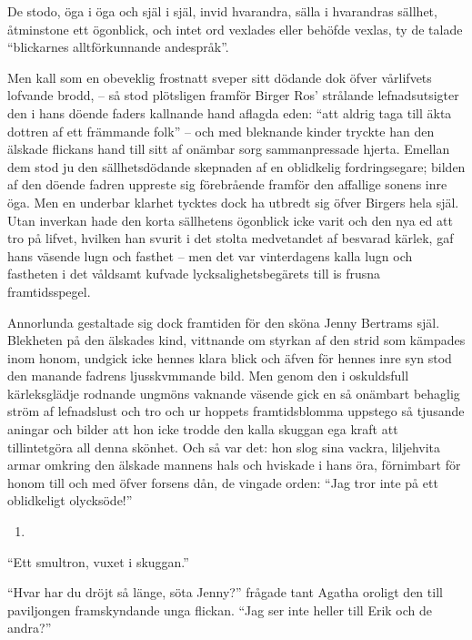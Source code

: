 De stodo, öga i öga och själ i själ, invid hvarandra, sälla i hvarandras
sällhet, åtminstone ett ögonblick, och intet ord vexlades eller behöfde
vexlas, ty de talade ``blickarnes alltförkunnande andespråk''.

Men kall som en obeveklig frostnatt sveper sitt dödande dok öfver
vårlifvets lofvande brodd, -- så stod plötsligen framför Birger Ros'
strålande lefnadsutsigter den i hans döende faders kallnande hand
aflagda eden: ``att aldrig taga till äkta dottren af ett främmande
folk'' -- och med bleknande kinder tryckte han den älskade flickans hand
till sitt af onämbar sorg sammanpressade hjerta. Emellan dem stod ju den
sällhetsdödande skepnaden af en oblidkelig fordringsegare; bilden af den
döende fadren uppreste sig förebrående framför den affallige sonens inre
öga. Men en underbar klarhet tycktes dock ha utbredt sig öfver Birgers
hela själ. Utan inverkan hade den korta sällhetens ögonblick icke varit
och den nya ed att tro på lifvet, hvilken han svurit i det stolta
medvetandet af besvarad kärlek, gaf hans väsende lugn och fasthet -- men
det var vinterdagens kalla lugn och fastheten i det våldsamt kufvade
lycksalighetsbegärets till is frusna framtidsspegel.

Annorlunda gestaltade sig dock framtiden för den sköna Jenny Bertrams
själ. Blekheten på den älskades kind, vittnande om styrkan af den strid
som kämpades inom honom, undgick icke hennes klara blick och äfven för
hennes inre syn stod den manande fadrens ljusskvmmande bild. Men genom
den i oskuldsfull kärleksglädje rodnande ungmöns vaknande väsende gick
en så onämbart behaglig ström af lefnadslust och tro och ur hoppets
framtidsblomma uppstego så tjusande aningar och bilder att hon icke
trodde den kalla skuggan ega kraft att tillintetgöra all denna skönhet.
Och så var det: hon slog sina vackra, liljehvita armar omkring den
älskade mannens hals och hviskade i hans öra, förnimbart för honom till
och med öfver forsens dån, de vingade orden: ``Jag tror inte på ett
oblidkeligt olycksöde!''

\begin{enumerate}
\def\labelenumi{\arabic{enumi}.}
\setcounter{enumi}{12}
\tightlist
\item
\end{enumerate}

``Ett smultron, vuxet i skuggan.''

``Hvar har du dröjt så länge, söta Jenny?'' frågade tant Agatha oroligt
den till paviljongen framskyndande unga flickan. ``Jag ser inte heller
till Erik och de andra?''

